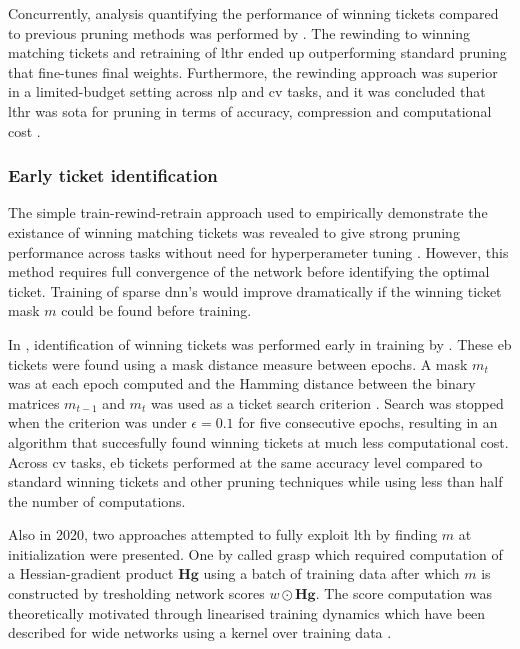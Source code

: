 \documentclass[12pt,fleqn,twocolumn]{article}
\begin{document}
Concurrently, analysis quantifying the performance of winning tickets compared to previous pruning methods was performed by \textcite{Renda2020ComparingRA}.
The rewinding to winning matching tickets and retraining of \acrshort{lthr} ended up outperforming standard pruning that fine-tunes final weights.
Furthermore, the rewinding approach was superior in a limited-budget setting across \acrfull{nlp} and \acrfull{cv} tasks, and it was concluded that \acrshort{lthr} was \acrfull{sota} for pruning in terms of accuracy, compression and computational cost \cite[Chap. 6]{Renda2020ComparingRA} \cite{lange2020lth}.

\subsubsection*{Early ticket identification}
The simple train-rewind-retrain approach used to empirically demonstrate the existance of winning matching tickets was revealed to give strong pruning performance across tasks without need for hyperperameter tuning \cite[Chap. 6]{Renda2020ComparingRA}.
However, this method requires full convergence of the network before identifying the optimal ticket.
Training of sparse \acrshort{dnn}'s would improve dramatically if the winning ticket mask $m$ could be found before training.

In \citeyear{You2020DrawingET}, identification of winning tickets was performed early in training by \textcite{You2020DrawingET}.
These \acrfull{eb} tickets were found using a mask distance measure between epochs.
A mask $m_t$ was at each epoch computed and the Hamming distance between the binary matrices $m_{t-1}$ and $m_{t}$ was used as a ticket search criterion \cite[Chap. 3.3]{You2020DrawingET}.
Search was stopped when the criterion was under $\epsilon = 0.1$ for five consecutive epochs, resulting in an algorithm that succesfully found winning tickets at much less computational cost.
Across \acrshort{cv} tasks, \acrshort{eb} tickets performed at the same accuracy level compared to standard winning tickets and other pruning techniques while using less than half the number of computations.

Also in 2020, two approaches attempted to fully exploit \acrshort{lth} by finding $m$ at initialization were presented.
One by \textcite{Wang2020PickingWT} called \acrfull{grasp} which required computation of a Hessian-gradient product $\mathbf H \mathbf g$ using a batch of training data after which $m$ is constructed by tresholding network scores $w \odot \mathbf H \mathbf g$.
The score computation was theoretically motivated through linearised training dynamics \cite[Chap. 4.1]{Wang2020PickingWT} which have been described for wide networks using a kernel over training data \cite{Lee2019WideNN}.
\end{document}
